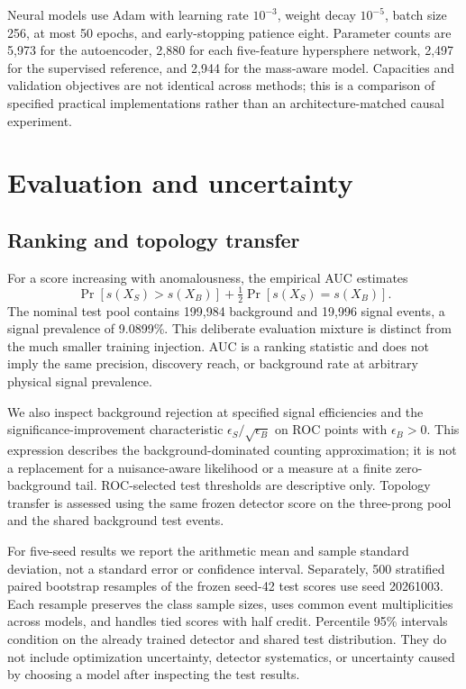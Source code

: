 \documentclass[reprint,aps,pra,amsmath,amssymb,floatfix,raggedbottom]{revtex4-2}
\begin{document}
Neural models use Adam with learning rate $10^{-3}$, weight decay $10^{-5}$, batch size 256, at most 50 epochs, and early-stopping patience eight. Parameter counts are 5,973 for the autoencoder, 2,880 for each five-feature hypersphere network, 2,497 for the supervised reference, and 2,944 for the mass-aware model. Capacities and validation objectives are not identical across methods; this is a comparison of specified practical implementations rather than an architecture-matched causal experiment.

\section{Evaluation and uncertainty}
\subsection{Ranking and topology transfer}
For a score increasing with anomalousness, the empirical AUC estimates
\begin{equation}
 \Pr[s(X_S)>s(X_B)]+\tfrac12\Pr[s(X_S)=s(X_B)].
\end{equation}
The nominal test pool contains 199,984 background and 19,996 signal events, a signal prevalence of 9.0899\%. This deliberate evaluation mixture is distinct from the much smaller training injection. AUC is a ranking statistic and does not imply the same precision, discovery reach, or background rate at arbitrary physical signal prevalence.

We also inspect background rejection at specified signal efficiencies and the significance-improvement characteristic $\epsilon_S/\sqrt{\epsilon_B}$ on ROC points with $\epsilon_B>0$. This expression describes the background-dominated counting approximation; it is not a replacement for a nuisance-aware likelihood or a measure at a finite zero-background tail. ROC-selected test thresholds are descriptive only. Topology transfer is assessed using the same frozen detector score on the three-prong pool and the shared background test events.

For five-seed results we report the arithmetic mean and sample standard deviation, not a standard error or confidence interval. Separately, 500 stratified paired bootstrap resamples of the frozen seed-42 test scores use seed 20261003. Each resample preserves the class sample sizes, uses common event multiplicities across models, and handles tied scores with half credit. Percentile 95\% intervals condition on the already trained detector and shared test distribution. They do not include optimization uncertainty, detector systematics, or uncertainty caused by choosing a model after inspecting the test results.
\end{document}
